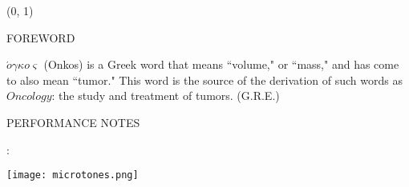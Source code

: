 \documentclass[10pt]{article}
\begin{document}
\begin{textblock}{23}(0, 1)
\begin{center}
\huge FOREWORD
\end{center}
\end{textblock}

\begingroup
\begin{center}
\hspace{10mm} $\acute{o} \gamma \kappa o \varsigma$ (Onkos) is a Greek word that means ``volume," or ``mass," and has come to also mean ``tumor." This word is the source of the derivation of such words as $Oncology$: the study and treatment of tumors.
\rightskip\leftskip
\phantom{text} \hfill (G.R.E.)
\end{center}
\endgroup 


\begin{center}
\huge PERFORMANCE NOTES
\end{center}


\begin{center}
:
\end{center}

\begin{center}
\texttt{[image: microtones.png]}
\end{center}
\end{document}
